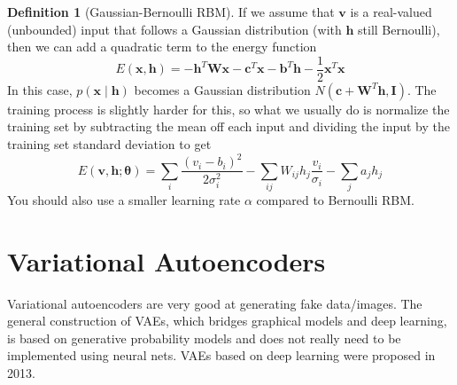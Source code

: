 \documentclass{article}
\theoremstyle{definition}
\theoremstyle{remark}
\theoremstyle{definition}
\newtheorem{definition}{Definition}[section]
\begin{document}
      \begin{definition}[Gaussian-Bernoulli RBM] 
        If we assume that $\mathbf{v}$ is a real-valued (unbounded) input that follows a Gaussian distribution (with $\mathbf{h}$ still Bernoulli), then we can add a quadratic term to the energy function 
          \[E(\mathbf{x}, \mathbf{h}) = - \mathbf{h}^T \mathbf{W} \mathbf{x} - \mathbf{c}^T \mathbf{x} - \mathbf{b}^T \mathbf{h} - \frac{1}{2} \mathbf{x}^T \mathbf{x}\]
        In this case, $p(\mathbf{x} \mid \mathbf{h})$ becomes a Gaussian distribution $N(\mathbf{c} + \mathbf{W}^T \mathbf{h}, \mathbf{I})$. The training process is slightly harder for this, so what we usually do is normalize the training set by subtracting the mean off each input and dividing the input by the training set standard deviation to get  
          \[E(\mathbf{v}, \mathbf{h}; \boldsymbol{\theta}) = \sum_i \frac{(v_i - b_i)^2}{2 \sigma_i^2} - \sum_{ij} W_{ij} h_j \frac{v_i}{\sigma_i} - \sum_j a_j h_j\]
        You should also use a smaller learning rate $\alpha$ compared to Bernoulli RBM. 
      \end{definition} 

\section{Variational Autoencoders}

  Variational autoencoders are very good at generating fake data/images. The general construction of VAEs, which bridges graphical models and deep learning, is based on generative probability models and does not really need to be implemented using neural nets. VAEs based on deep learning were proposed in 2013. 
\end{document}
